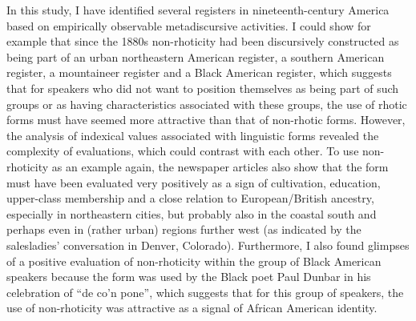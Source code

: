 In this study, I have identified several registers in nineteenth-century America based on empirically observable metadiscursive activities. I could show for example that since the 1880s non-rhoticity had been discursively constructed as being part of an urban northeastern American register, a southern American register, a mountaineer register and a Black American register, which suggests that for speakers who did not want to position themselves as being part of such groups or as having characteristics associated with these groups, the use of rhotic forms must have seemed more attractive than that of non-rhotic forms. However, the analysis of indexical values associated with linguistic forms revealed the complexity of evaluations, which could contrast with each other. To use non-rhoticity as an example again, the newspaper articles also show that the form must have been evaluated very positively as a sign of cultivation, education, upper-class membership and a close relation to European/British ancestry, especially in northeastern cities, but probably also in the coastal south and perhaps even in (rather urban) regions further west (as indicated by the salesladies’ conversation in Denver, Colorado). Furthermore, I also found glimpses of a positive evaluation of non-rhoticity within the group of Black American speakers because the form was used by the Black poet Paul Dunbar in his celebration of “de co’n pone”, which suggests that for this group of speakers, the use of non-rhoticity was attractive as a signal of African American identity.

